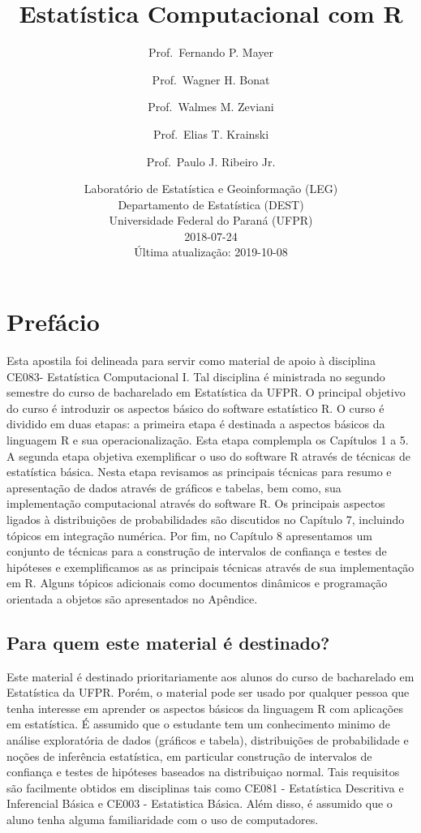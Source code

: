 \documentclass[10pt,a4paper]{book}
\title{Estatística Computacional com R}
\author{Prof.~Fernando P. Mayer \and Prof.~Wagner H. Bonat \and Prof.~Walmes M. Zeviani \and Prof.~Elias T. Krainski \and Prof.~Paulo J. Ribeiro Jr.}
\date{Laboratório de Estatística e Geoinformação (LEG)\\
Departamento de Estatística (DEST)\\
Universidade Federal do Paraná (UFPR)\\[2\baselineskip]2018-07-24\\
Última atualização: 2019-10-08}
\begin{document}
\maketitle

{
\hypersetup{linkcolor=black}
\setcounter{tocdepth}{2}
\tableofcontents
}
\chapter*{Prefácio}\label{prefuxe1cio}


Esta apostila foi delineada para servir como material de apoio à
disciplina CE083- Estatística Computacional I. Tal disciplina é
ministrada no segundo semestre do curso de bacharelado em Estatística da
UFPR. O principal objetivo do curso é introduzir os aspectos básico do
software estatístico R. O curso é dividido em duas etapas: a primeira
etapa é destinada a aspectos básicos da linguagem R e sua
operacionalização. Esta etapa complempla os Capítulos 1 a 5. A segunda
etapa objetiva exemplificar o uso do software R através de técnicas de
estatística básica. Nesta etapa revisamos as principais técnicas para
resumo e apresentação de dados através de gráficos e tabelas, bem como,
sua implementação computacional através do software R. Os principais
aspectos ligados à distribuições de probabilidades são discutidos no
Capítulo 7, incluindo tópicos em integração numérica. Por fim, no
Capítulo 8 apresentamos um conjunto de técnicas para a construção de
intervalos de confiança e testes de hipóteses e exemplificamos as as
principais técnicas através de sua implementação em R. Alguns tópicos
adicionais como documentos dinâmicos e programação orientada a objetos
são apresentados no Apêndice.

\section*{Para quem este material é
destinado?}\label{para-quem-este-material-uxe9-destinado}


Este material é destinado prioritariamente aos alunos do curso de
bacharelado em Estatística da UFPR. Porém, o material pode ser usado por
qualquer pessoa que tenha interesse em aprender os aspectos básicos da
linguagem R com aplicações em estatística. É assumido que o estudante
tem um conhecimento minimo de análise exploratória de dados (gráficos e
tabela), distribuições de probabilidade e noções de inferência
estatística, em particular construção de intervalos de confiança e
testes de hipóteses baseados na distribuiçao normal. Tais requisitos são
facilmente obtidos em disciplinas tais como CE081 - Estatística
Descritiva e Inferencial Básica e CE003 - Estatistica Básica. Além
disso, é assumido que o aluno tenha alguma familiaridade com o uso de
computadores.
\end{document}
